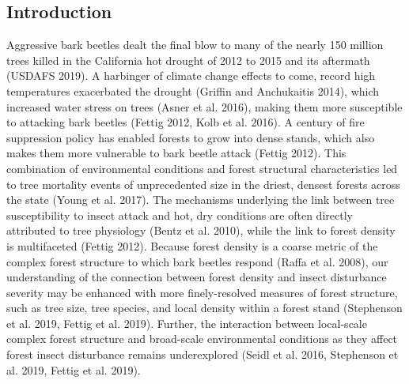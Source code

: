 \documentclass[]{article}
\begin{document}
\subsection{Introduction}\label{introduction}

Aggressive bark beetles dealt the final blow to many of the nearly 150
million trees killed in the California hot drought of 2012 to 2015 and
its aftermath (USDAFS 2019). A harbinger of climate change effects to
come, record high temperatures exacerbated the drought (Griffin and
Anchukaitis 2014), which increased water stress on trees (Asner et al.
2016), making them more susceptible to attacking bark beetles (Fettig
2012, Kolb et al. 2016). A century of fire suppression policy has
enabled forests to grow into dense stands, which also makes them more
vulnerable to bark beetle attack (Fettig 2012). This combination of
environmental conditions and forest structural characteristics led to
tree mortality events of unprecedented size in the driest, densest
forests across the state (Young et al. 2017). The mechanisms underlying
the link between tree susceptibility to insect attack and hot, dry
conditions are often directly attributed to tree physiology (Bentz et
al. 2010), while the link to forest density is multifaceted (Fettig
2012). Because forest density is a coarse metric of the complex forest
structure to which bark beetles respond (Raffa et al. 2008), our
understanding of the connection between forest density and insect
disturbance severity may be enhanced with more finely-resolved measures
of forest structure, such as tree size, tree species, and local density
within a forest stand (Stephenson et al. 2019, Fettig et al. 2019).
Further, the interaction between local-scale complex forest structure
and broad-scale environmental conditions as they affect forest insect
disturbance remains underexplored (Seidl et al. 2016, Stephenson et al.
2019, Fettig et al. 2019).
\end{document}

